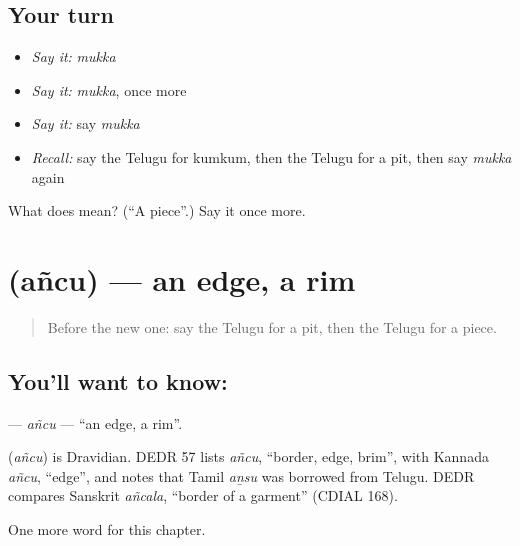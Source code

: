 \subsection*{Your turn}
\begin{itemize}
\raggedright
  \item \emph{Say it:} \emph{mukka}
  \item \emph{Say it:} \emph{mukka}, once more
  \item \emph{Say it:} say \emph{mukka}
  \item \emph{Recall:} say the Telugu for kumkum, then the Telugu for a pit, then say \emph{mukka} again
\end{itemize}

\begin{tcolorbox}[breakable,colback=teal!4,colframe=teal!35!black,title={Before you move on}]
What does  mean? (\textquotedblleft{}A piece\textquotedblright{}.) Say it once more.
\end{tcolorbox}
\section[\texorpdfstring{\te{అంచు} (añcu)}{అంచు (añcu)}]{ (añcu) — an edge, a rim}

\label{lesson:TE-C308-ancu}



\begin{quote}
Before the new one: say the Telugu for a pit, then the Telugu for a piece.
\end{quote}

\subsection*{You'll want to know: }
\textbf{} — \emph{añcu} — \textquotedblleft{}an edge, a rim\textquotedblright{}.

\begin{cousinweb}
\textbf{} (\emph{añcu}) is Dravidian. DEDR 57 lists \emph{añcu}, \textquotedblleft{}border, edge, brim\textquotedblright{}, with Kannada \emph{añcu}, \textquotedblleft{}edge\textquotedblright{}, and notes that Tamil \emph{aṉsu} was borrowed from Telugu. DEDR compares Sanskrit \emph{añcala}, \textquotedblleft{}border of a garment\textquotedblright{} (CDIAL 168).
\end{cousinweb}

\begin{grammarlens}[title={What you've built}]
One more word for this chapter.
\end{grammarlens}

